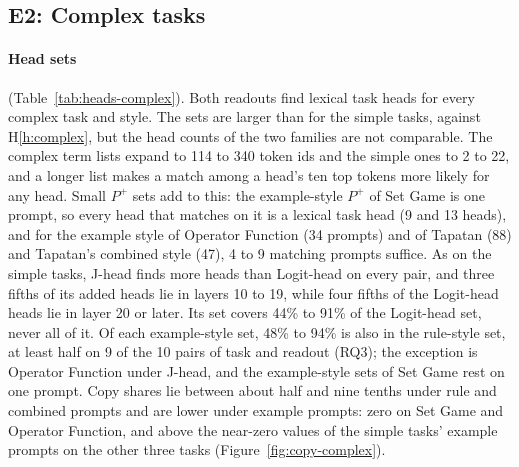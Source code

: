 \documentclass[11pt,a4paper]{article}
\begin{document}
\begin{table}[tbp]
\centering\footnotesize\setlength{\tabcolsep}{3.5pt}

\caption{E0, complex tasks: flexible accuracy per prompt (Sec.~\ref{sec:evaluation}), on the same saved replies and with the same layout as Table~\ref{tab:e0-complex}.}
\label{tab:e0-complex-flexible}
\end{table}

\subsection{E2: Complex tasks}\label{sec:res-e2}
\paragraph{Head sets} (Table~\ref{tab:heads-complex}). Both readouts find lexical task heads for every complex task and style. The sets are larger than for the simple tasks, against H\ref{h:complex}, but the head counts of the two families are not comparable. The complex term lists expand to 114 to 340 token ids and the simple ones to 2 to 22, and a longer list makes a match among a head's ten top tokens more likely for any head. Small $P^{+}$ sets add to this: the example-style $P^{+}$ of Set Game is one prompt, so every head that matches on it is a lexical task head (9 and 13 heads), and for the example style of Operator Function (34 prompts) and of Tapatan (88) and Tapatan's combined style (47), 4 to 9 matching prompts suffice. As on the simple tasks, J-head finds more heads than Logit-head on every pair, and three fifths of its added heads lie in layers 10 to 19, while four fifths of the Logit-head heads lie in layer 20 or later. Its set covers 44\% to 91\% of the Logit-head set, never all of it. Of each example-style set, 48\% to 94\% is also in the rule-style set, at least half on 9 of the 10 pairs of task and readout (RQ3); the exception is Operator Function under J-head, and the example-style sets of Set Game rest on one prompt. Copy shares lie between about half and nine tenths under rule and combined prompts and are lower under example prompts: zero on Set Game and Operator Function, and above the near-zero values of the simple tasks' example prompts on the other three tasks (Figure~\ref{fig:copy-complex}).
\end{document}
